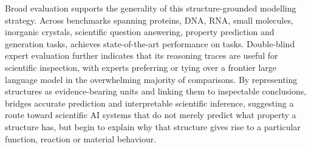 Broad evaluation supports the generality of this structure-grounded modelling strategy. Across \totalTasks{} benchmarks spanning proteins, DNA, RNA, small molecules, inorganic crystals, scientific question answering, property prediction and generation tasks, \projName{} achieves state-of-the-art performance on \totalSOTATasks{} tasks. Double-blind expert evaluation further indicates that its reasoning traces are useful for scientific inspection, with experts preferring or tying \projName{} over a frontier large language model in the overwhelming majority of comparisons. By representing structures as evidence-bearing units and linking them to inspectable conclusions, \projName{} bridges accurate prediction and interpretable scientific inference, suggesting a route toward scientific AI systems that do not merely predict what property a structure has, but begin to explain why that structure gives rise to a particular function, reaction or material behaviour. 





 
 


 


 



 


 

 

 

 
 
 
 
 

 
 
 
 


 
 
 
 
 
 


 


 
 
 


 
 
 

